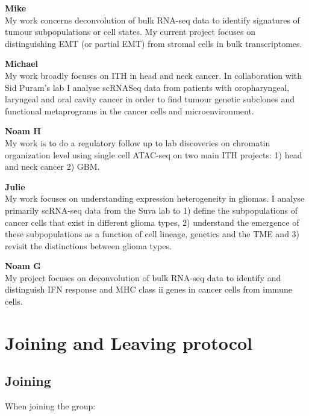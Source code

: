 \documentclass[
]{book}
\begin{document}
\textbf{Mike}\\
My work concerns deconvolution of bulk RNA-seq data to identify signatures of tumour subpopulations or cell states. My current project focuses on distinguishing EMT (or partial EMT) from stromal cells in bulk transcriptomes.

\textbf{Michael}\\
My work broadly focuses on ITH in head and neck cancer. In collaboration with Sid Puram's lab I analyse scRNASeq data from patients with oropharyngeal, laryngeal and oral cavity cancer in order to find tumour genetic subclones and functional metaprograms in the cancer cells and microenvironment.

\textbf{Noam H}\\
My work is to do a regulatory follow up to lab discoveries on chromatin organization level using single cell ATAC-seq on two main ITH projects: 1) head and neck cancer 2) GBM.

\textbf{Julie}\\
My work focuses on understanding expression heterogeneity in gliomas. I analyse primarily scRNA-seq data from the Suva lab to 1) define the subpopulations of cancer cells that exist in different glioma types, 2) understand the emergence of these subpopulations as a function of cell lineage, genetics and the TME and 3) revisit the distinctions between glioma types.

\textbf{Noam G}\\
My project focuses on deconvolution of bulk RNA-seq data to identify and distinguish IFN response and MHC class ii genes in cancer cells from immune cells.

\hypertarget{joiningLeaving}{%
\chapter{Joining and Leaving protocol}\label{joiningLeaving}}

\hypertarget{joining}{%
\section{Joining}\label{joining}}

When joining the group:
\end{document}

